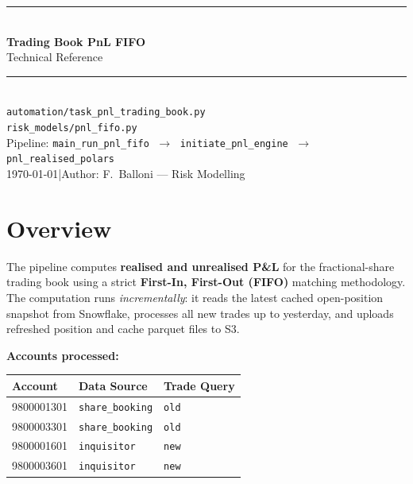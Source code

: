 \documentclass[11pt, a4paper]{article}
\begin{document}
\thispagestyle{empty}
{\color{TR_DARK}
\vspace*{3cm}
\noindent\rule{\linewidth}{3pt}\\[0.5em]
{\huge\bfseries\color{TR_DARK} Trading Book PnL FIFO}\\[0.3em]
{\Large\color{TR_BLUE} Technical Reference}\\[0.3em]
\noindent\rule{\linewidth}{1pt}\\[1.5em]
{\large
  \texttt{automation/task\_pnl\_trading\_book.py}\\[0.3em]
  \texttt{risk\_models/pnl\_fifo.py}
}\\[2.5em]
{\normalsize\color{gray}
  Pipeline: \texttt{main\_run\_pnl\_fifo}
  $\;\to\;$ \texttt{initiate\_pnl\_engine}
  $\;\to\;$ \texttt{pnl\_realised\_polars}\\[0.5em]
  \today \quad|\quad Author: F.\ Balloni — Risk Modelling
}
}
\newpage

\tableofcontents
\newpage

\section{Overview}

The pipeline computes \textbf{realised and unrealised P\&L} for the
fractional-share trading book using a strict
\textbf{First-In, First-Out (FIFO)} matching methodology.
The computation runs \emph{incrementally}: it reads the latest cached
open-position snapshot from Snowflake, processes all new trades
up to yesterday, and uploads refreshed position and cache parquet
files to S3.

\medskip
\begin{mdframed}[backgroundcolor=TR_GRAY, linecolor=TR_BLUE,
                 linewidth=1pt, roundcorner=4pt]
\textbf{Accounts processed:}\\[6pt]
\begin{tabular}{lll}
  \toprule
  Account    & Data Source          & Trade Query \\
  \midrule
  9800001301 & \texttt{share\_booking} & \texttt{old} \\
  9800003301 & \texttt{share\_booking} & \texttt{old} \\
  9800001601 & \texttt{inquisitor}     & \texttt{new} \\
  9800003601 & \texttt{inquisitor}     & \texttt{new} \\
  \bottomrule
\end{tabular}
\end{mdframed}
\end{document}
